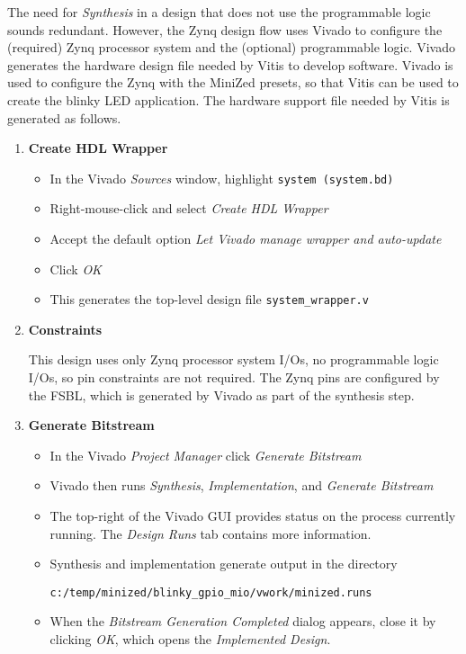 \begin{enumerate}
The need for \emph{Synthesis} in a design that does not use the programmable
logic sounds redundant. However, the Zynq design flow uses Vivado to configure
the (required) Zynq processor system and the (optional) programmable logic.
%
Vivado generates the hardware design file needed by Vitis to develop software. 
Vivado is used to configure the Zynq with the MiniZed presets, so that Vitis 
can be used to create the blinky LED application. The hardware support file
needed by Vitis is generated as follows.
%
\begin{enumerate}
%
\item {\bf Create HDL Wrapper}
%
\begin{itemize}
\item In the Vivado \emph{Sources} window, highlight \verb+system (system.bd)+
\item Right-mouse-click and select \emph{Create HDL Wrapper}
\item Accept the default option \emph{Let Vivado manage wrapper and auto-update}
\item Click \emph{OK}
\item This generates the top-level design file \verb+system_wrapper.v+
\end{itemize}
%
\item {\bf Constraints}

This design uses only Zynq processor system I/Os, no programmable logic I/Os,
so pin constraints are not required. The Zynq pins are configured by the
FSBL, which is generated by Vivado as part of the synthesis step.
%
\item {\bf Generate Bitstream}
%
\begin{itemize}
\item In the Vivado \emph{Project Manager} click \emph{Generate Bitstream}
\item Vivado then runs \emph{Synthesis}, \emph{Implementation}, and 
\emph{Generate Bitstream}
\item The top-right of the Vivado GUI provides status on the process
currently running. The \emph{Design Runs} tab contains more information.
\item Synthesis and implementation generate output in the directory

\verb+c:/temp/minized/blinky_gpio_mio/vwork/minized.runs+

\item When the \emph{Bitstream Generation Completed} dialog appears, close it
by clicking \emph{OK}, which opens the \emph{Implemented Design}.


\end{itemize}
\end{enumerate}
\end{enumerate}

